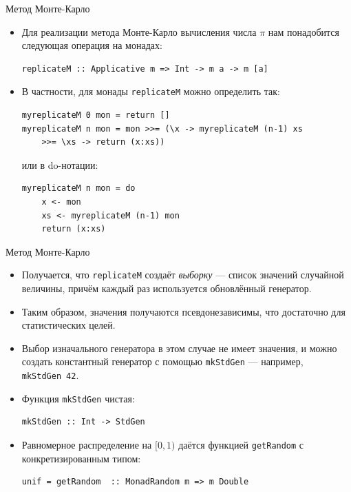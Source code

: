 \documentclass[xcolor=dvipsnames]{beamer}
\begin{document}
\begin{frame}[fragile]{Метод Монте-Карло}
 
 \begin{itemize}[<+->]
  \item Для реализации метода Монте-Карло вычисления числа $\pi$ нам понадобится следующая операция на монадах:
  \begin{verbatim}
replicateM :: Applicative m => Int -> m a -> m [a]   
  \end{verbatim}
  \item В частности, для монады {\tt replicateM} можно определить так:
  \begin{verbatim}
myreplicateM 0 mon = return []
myreplicateM n mon = mon >>= (\x -> myreplicateM (n-1) xs 
    >>= \xs -> return (x:xs))
  \end{verbatim}
  или в do-нотации:
  \begin{verbatim}
myreplicateM n mon = do
    x <- mon
    xs <- myreplicateM (n-1) mon
    return (x:xs)
  \end{verbatim}


 \end{itemize}

\end{frame}


\begin{frame}[fragile]{Метод Монте-Карло}
 
 \begin{itemize}[<+->]
  \item Получается, что {\tt replicateM} создаёт {\em выборку} --- список значений случайной величины, причём каждый раз используется обновлённый генератор.
  \item Таким образом, значения получаются псевдонезависимы, что достаточно для статистических целей.
  \item Выбор изначального генератора в этом случае не имеет значения, и можно создать константный генератор с помощью {\tt mkStdGen} --- например, {\tt mkStdGen}\ \texttt{42}.
  \item Функция {\tt mkStdGen} чистая:
  \begin{verbatim}
mkStdGen :: Int -> StdGen
  \end{verbatim}
  \item Равномерное распределение на $[0,1)$ даётся функцией {\tt getRandom} с конкретизированным типом:
  \begin{verbatim}
unif = getRandom  :: MonadRandom m => m Double
  \end{verbatim}

 \end{itemize}

 
\end{frame}
\end{document}
